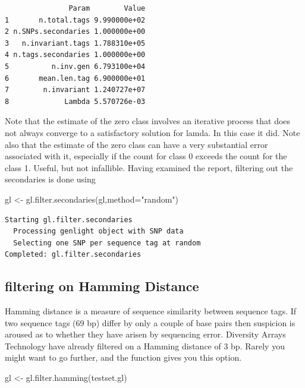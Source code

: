 \documentclass[
  letterpaper,
  DIV=11,
  numbers=noendperiod]{scrreprt}
\newenvironment{Shaded}{\begin{snugshade}}{\end{snugshade}}
\newcommand{\AttributeTok}[1]{\textcolor[rgb]{0.49,0.56,0.16}{#1}}
\newcommand{\FunctionTok}[1]{\textcolor[rgb]{0.02,0.16,0.49}{#1}}
\newcommand{\NormalTok}[1]{\textcolor[rgb]{0.00,0.44,0.13}{#1}}
\newcommand{\OtherTok}[1]{\textcolor[rgb]{0.00,0.44,0.13}{#1}}
\newcommand{\StringTok}[1]{\textcolor[rgb]{0.25,0.44,0.63}{#1}}
\let\textttOrig\texttt
\renewcommand{\texttt}[1]{\textttOrig{\color{blue}{#1}}}
\begin{document}
\begin{verbatim}
               Param        Value
1       n.total.tags 9.990000e+02
2 n.SNPs.secondaries 1.000000e+00
3   n.invariant.tags 1.788310e+05
4 n.tags.secondaries 1.000000e+00
5          n.inv.gen 6.793100e+04
6       mean.len.tag 6.900000e+01
7        n.invariant 1.240727e+07
8             Lambda 5.570726e-03
\end{verbatim}

Note that the estimate of the zero class involves an iterative process
that does not always converge to a satisfactory solution for lamda. In
this case it did. Note also that the estimate of the zero class can have
a very substantial error associated with it, especially if the count for
class 0 exceeds the count for the class 1. Useful, but not infallible.
Having examined the report, filtering out the secondaries is done using

\begin{Shaded}
\begin{Highlighting}[]
\NormalTok{gl }\OtherTok{\textless{}{-}} \FunctionTok{gl.filter.secondaries}\NormalTok{(gl,}\AttributeTok{method=}\StringTok{"random"}\NormalTok{)}
\end{Highlighting}
\end{Shaded}

\begin{verbatim}
Starting gl.filter.secondaries 
  Processing genlight object with SNP data
  Selecting one SNP per sequence tag at random
Completed: gl.filter.secondaries 
\end{verbatim}

\hypertarget{filtering-on-hamming-distance}{%
\subsection*{filtering on Hamming
Distance}\label{filtering-on-hamming-distance}}

Hamming distance is a measure of sequence similarity between sequence
tags. If two sequence tags (69 bp) differ by only a couple of base pairs
then suspicion is aroused as to whether they have arisen by sequencing
error. Diversity Arrays Technology have already filtered on a Hamming
distance of 3 bp. Rarely you might want to go further, and the
\texttt{gl.filter.hamming} function gives you this option.

\begin{Shaded}
\begin{Highlighting}[]
\NormalTok{gl }\OtherTok{\textless{}{-}} \FunctionTok{gl.filter.hamming}\NormalTok{(testset.gl)}
\end{Highlighting}
\end{Shaded}
\end{document}
